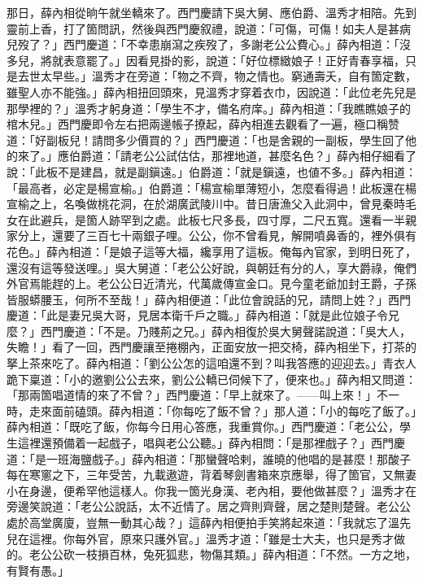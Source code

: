 那日，薛內相從晌午就坐轎來了。西門慶請下吳大舅、應伯爵、溫秀才相陪。先到靈前上香，打了箇問訊，然後與西門慶叙禮，說道：「可傷，可傷！如夫人是甚病兒歿了？」{}西門慶道：「不幸患崩瀉之疾歿了，多謝老公公費心。」薛內相道：「沒多兒，將就表意罷了。」因看見掛的影，說道：「好位標緻娘子！{}正好青春享福，只是去世太早些。」溫秀才在旁道：「物之不齊，物之情也。{}窮通壽夭，自有箇定數，雖聖人亦不能強。」薛內相扭回頭來，見溫秀才穿着衣巾，{}因說道：「此位老先兒是那學裡的？」溫秀才躬身道：「學生不才，備名府庠。」薛內相道：「我瞧瞧娘子的棺木兒。」{}西門慶即令左右把兩邊帳子撩起，薛內相進去觀看了一遍，極口稱赞道：「好副板兒！請問多少價買的？」西門慶道：「也是舍親的一副板，學生回了他的來了。」應伯爵道：「請老公公試估估，那裡地道，甚麼名色？」薛內相仔細看了說：「此板不是建昌，就是副鎭遠。」伯爵道：「就是鎭遠，也値不多。」薛內相道：「最高者，必定是楊宣榆。」伯爵道：「楊宣榆單薄短小，怎麼看得過！此板還在楊宣榆之上，名喚做桃花洞，在於湖廣武陵川中。昔日唐漁父入此洞中，曾見秦時毛女在此避兵，是箇人跡罕到之處。此板七尺多長，四寸厚，二尺五寬。還看一半親家分上，還要了三百七十兩銀子哩。公公，你不曾看見，解開噴鼻香的，裡外俱有花色。」薛內相道：「是娘子這等大福，纔享用了這板。俺每內官家，到明日死了，還沒有這等發送哩。」吳大舅道：「老公公好說，與朝廷有分的人，享大爵祿，俺們外官焉能趕的上。老公公日近清光，代萬歲傳宣金口。見今童老爺加封王爵，子孫皆服蟒腰玉，何所不至哉！」薛內相便道：「此位會說話的兄，{}請問上姓？」西門慶道：「此是妻兄吳大哥，見居本衛千戶之職。」薛內相道：「就是此位娘子令兄麼？」{}西門慶道：「不是。乃賤荊之兄。」薛內相復於吳大舅聲諾說道：「吳大人，失瞻！」{}看了一回，西門慶讓至捲棚內，正面安放一把交椅，薛內相坐下，打茶的拏上茶來吃了。薛內相道：「劉公公怎的這咱還不到？叫我答應的迎迎去。」青衣人跪下稟道：「小的邀劉公公去來，劉公公轎已伺候下了，便來也。」薛內相又問道：「那兩箇唱道情的來了不曾？」西門慶道：「早上就來了。——叫上來！」不一時，走來面前磕頭。薛內相道：「你每吃了飯不曾？」那人道：「小的每吃了飯了。」薛內相道：「既吃了飯，你每今日用心答應，我重賞你。」西門慶道：「老公公，學生這裡還預備着一起戲子，唱與老公公聽。」薛內相問：「是那裡戲子？」西門慶道：「是一班海鹽戲子。」薛內相道：「那蠻聲哈剌，誰曉的他唱的是甚麼！那酸子每在寒窻之下，三年受苦，九載遨遊，背着琴劍書箱來京應舉，得了箇官，又無妻小在身邊，便希罕他這樣人。你我一箇光身漢、老內相，要他做甚麼？」溫秀才在旁邊笑說道：{}「老公公說話，太不近情了。居之齊則齊聲，居之楚則楚聲。老公公處於高堂廣廈，豈無一動其心哉？」這薛內相便拍手笑將起來道：「我就忘了溫先兒在這裡。你每外官，原來只護外官。」溫秀才道：「雖是士大夫，也只是秀才做的。老公公砍一枝損百林，兔死狐悲，物傷其類。」薛內相道：「不然。一方之地，有賢有愚。」


